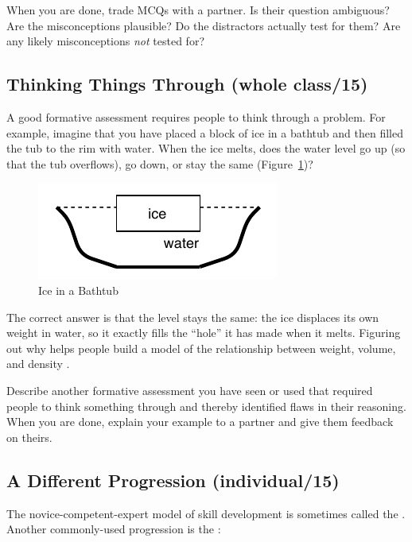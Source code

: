 When you are done, trade MCQs with a partner.
Is their question ambiguous?
Are the misconceptions plausible?
Do the distractors actually test for them?
Are any likely misconceptions \emph{not} tested for?

\subsection*{Thinking Things Through (whole class/15)}

A good formative assessment requires people to think through a problem.
For example,
imagine that you have placed a block of ice in a bathtub and then filled the tub to the rim with water.
When the ice melts,
does the water level go up (so that the tub overflows),
go down,
or stay the same (Figure~\ref{f:models-bathtub})?

\begin{figure}
\centering
\includegraphics{../../figures/bathtub.pdf}
\caption{Ice in a Bathtub}
\label{f:models-bathtub}
\end{figure}

The correct answer is that the level stays the same:
the ice displaces its own weight in water,
so it exactly fills the ``hole'' it has made when it melts.
Figuring out why helps people build a model of the relationship between weight, volume, and density \cite{Epst2002}.

Describe another formative assessment you have seen or used
that required people to think something through
and thereby identified flaws in their reasoning.
When you are done,
explain your example to a partner
and give them feedback on theirs.

\subsection*{A Different Progression (individual/15)}

The novice-competent-expert model of skill development
is sometimes called the .
Another commonly-used progression is
the :

